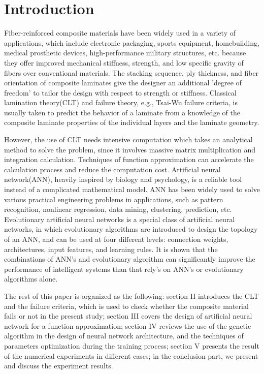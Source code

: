 \section{Introduction}
Fiber-reinforced composite materials have been widely used in a variety of
applications, which include electronic packaging, sports equipment,
homebuilding, medical prosthetic devices, high-performance military
structures, etc. because they offer improved mechanical stiffness, strength,
and low specific gravity of fibers over conventional materials.  The stacking
sequence, ply thickness, and fiber orientation of composite laminates give the
designer an additional ’degree of freedom’ to tailor the design with respect to
strength or stiffness. Classical lamination theory(CLT) and failure theory,
e.g., Tsai-Wu failure criteria, is usually taken to predict the behavior of a
laminate from a knowledge of the composite laminate properties of the
individual layers and the laminate geometry.

However, the use of CLT needs intensive computation which takes an analytical
method to solve the problem, since it involves massive matrix multiplication
and integration calculation. Techniques of function approximation can
accelerate the calculation process and reduce the computation cost.  Artificial
neural network(ANN), heavily inspired by biology and psychology, is a reliable
tool instead of a complicated mathematical model. ANN has been widely used to
solve various practical engineering problems in applications, such as pattern
recognition, nonlinear regression, data mining, clustering,  prediction, etc.
Evolutionary artificial neural networks is a special class of artificial neural
networks, in which evolutionary algorithms are introduced to design the
topology of an ANN, and can be used at four different levels: connection
weights, architectures, input features, and learning rules.  It is shown that
the combinations of ANN's and evolutionary algorithm \cite{lobo2007parameter}
can significantly improve the performance of intelligent systems than that
rely's on ANN's or evolutionary algorithms alone.

The rest of this paper is organized as the following: section II introduces the
CLT and the failure criteria, which is used to check whether the composite
material fails or not in the present study; section III covers the design of
artificial neural network for a function approximation; section IV reviews the
use of the genetic algorithm in the design of neural network architecture, and
the techniques of parameters optimization during the training process; section
V presents the result of the numerical experiments in different cases; in the
conclusion part, we present and discuss the experiment results.




